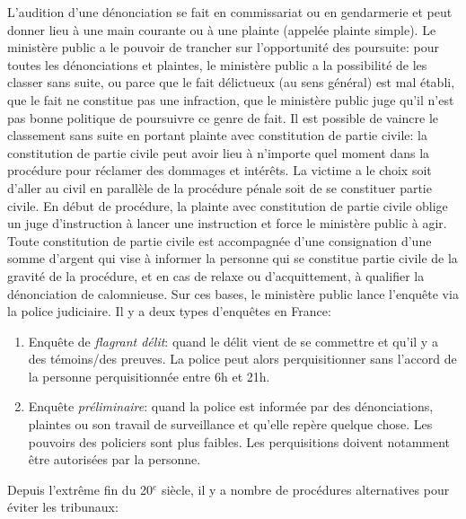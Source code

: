 \documentclass[math]{cours}
\begin{document}
	L'audition d'une dénonciation se fait en commissariat ou en gendarmerie et peut donner lieu à une main courante ou à une plainte (appelée plainte simple).
	Le ministère public a le pouvoir de trancher sur l'opportunité des poursuite:
	pour toutes les dénonciations et plaintes, le ministère public a la possibilité de les classer sans suite,
	ou parce que le fait délictueux (au sens général) est mal établi, que le fait ne constitue pas une infraction,
	que le ministère public juge qu'il n'est pas bonne politique de poursuivre ce genre de fait.
	Il est possible de vaincre le classement sans suite en portant plainte avec constitution de partie civile:
	la constitution de partie civile peut avoir lieu à n'importe quel moment dans la procédure pour réclamer des dommages et intérêts.
	La victime a le choix soit d'aller au civil en parallèle de la procédure pénale soit de se constituer partie civile.
	En début de procédure, la plainte avec constitution de partie civile oblige un juge d'instruction à lancer une instruction et force le ministère public à agir.
	Toute constitution de partie civile est accompagnée d'une consignation d'une somme d'argent qui vise à informer la personne qui se constitue partie civile de la gravité de la procédure, et en cas de relaxe ou d'acquittement, à qualifier la dénonciation de calomnieuse.
	Sur ces bases, le ministère public lance l'enquête via la police judiciaire.
	Il y a deux types d'enquêtes en France:
	\begin{enumerate}
		\item Enquête de \emph{flagrant délit}: quand le délit vient de se commettre et qu'il y a des témoins/des preuves.
			La police peut alors perquisitionner sans l'accord de la personne perquisitionnée entre 6h et 21h.
		\item Enquête \emph{préliminaire}: quand la police est informée par des dénonciations, plaintes ou son travail de surveillance et qu'elle repère quelque chose.
			Les pouvoirs des policiers sont plus faibles.
			Les perquisitions doivent notamment être autorisées par la personne.
	\end{enumerate}
	Depuis l'extrême fin du 20$^{e}$ siècle, il y a nombre de procédures alternatives pour éviter les tribunaux:
\end{document}
